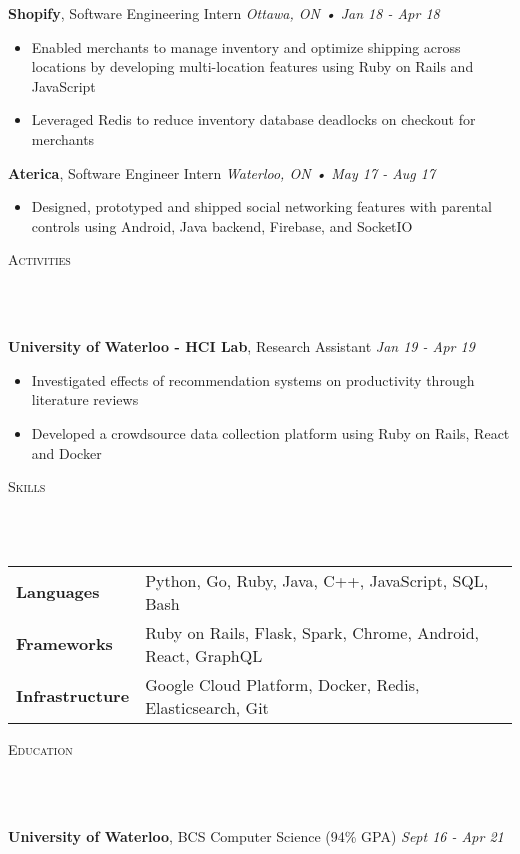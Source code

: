 \documentclass[a4paper, 12pt, hidelinks]{article}
\newcommand{\lineunder} {
    \vspace*{-8pt} \\
    \hrulefill \\
}
\newcommand{\header} [1] {
    \color{bigtext}
    {\hspace*{-4pt}\vspace*{6pt} \textsc{#1}}
    \vspace*{-6pt}
    \color{weaktext}
    \lineunder
    \vspace{6pt}
    \color{bodytext}
}
\newcommand{\nolocheader} [3] {
    \color{bigtext}\textbf{#1}, {#2}
    \color{weaktext}\hfill{\small\textit{#3}}\\
    \vspace{-2mm} \color{bodytext}
}
\newcommand{\jobheader} [4] {
    \nolocheader{#1}{#2}{\small\textit{#3} • \textit{#4}}
}
\begin{document}
\jobheader{Shopify}{Software Engineering Intern}{Ottawa, ON}{Jan 18 - Apr 18}
\begin{itemize}[leftmargin=1.8em] \itemsep 1pt \color{bodytext}
	\item Enabled merchants to manage inventory and optimize shipping across locations by developing
    multi-location features using Ruby on Rails and JavaScript
	\item Leveraged Redis to reduce inventory database deadlocks on checkout for merchants
\end{itemize}

\jobheader{Aterica}{Software Engineer Intern}{Waterloo, ON}{May 17 - Aug 17}
\begin{itemize}[leftmargin=1.8em] \itemsep 1pt \color{bodytext}
	\item Designed, prototyped and shipped social networking features with parental controls using Android,
    Java backend, Firebase, and SocketIO
\end{itemize}

\header{Activities}

\nolocheader{University of Waterloo - HCI Lab}{Research Assistant}{Jan 19 - Apr 19}
\begin{itemize}[leftmargin=1.8em] \itemsep 1pt \color{bodytext}
	\item Investigated effects of recommendation systems on productivity through literature reviews
	\item Developed a crowdsource data collection platform using Ruby on Rails, React and Docker
\end{itemize}

\header{Skills}

\hspace{-10pt}
\begin{tabular}{ l l }
    \color{bigtext}\textbf{Languages}\color{bodytext} & Python, Go, Ruby, Java, C++, JavaScript, SQL, Bash \\[2pt]
    \color{bigtext}\textbf{Frameworks}\color{bodytext} & Ruby on Rails, Flask, Spark, Chrome, Android, React, GraphQL \\[2pt]
    \color{bigtext}\textbf{Infrastructure}\color{bodytext} & Google Cloud Platform, Docker, Redis, Elasticsearch, Git
\end{tabular}
\vspace{3mm}

\header{Education}
\nolocheader{University of Waterloo}{BCS Computer Science (94\% GPA)}{Sept 16 - Apr 21}
\end{document}
